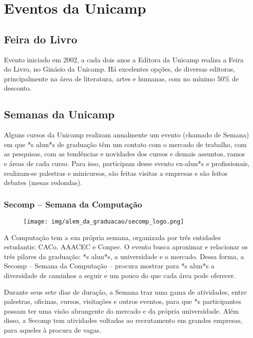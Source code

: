 
\section{Eventos da Unicamp}
\subsection{Feira do Livro}

Evento iniciado em 2002, a cada dois anos a Editora da Unicamp realiza a Feira
do Livro, no Ginásio da Unicamp. Há excelentes opções, de diversas editoras,
principalmente na área de literatura, artes e humanas, com no mínimo 50\% de
desconto.

\subsection{Semanas da Unicamp}

Alguns cursos da Unicamp realizam anualmente um evento (chamado de Semana) em
que *s alun*s de graduação têm um contato com o mercado de trabalho, com as
pesquisas, com as tendências e novidades dos cursos e demais assuntos, ramos e
áreas de cada curso. Para isso, participam desse evento ex-alun*s e
profissionais, realizam-se palestras e minicursos, são feitas visitas a empresas
e são feitos debates (mesas redondas).

\subsubsection{Secomp -- Semana da Computação}

\begin{figure}[H]
    \centering
    \texttt{[image: img/alem\_da\_graduacao/secomp\_logo.png]}
\end{figure}

A Computação tem a sua própria semana, organizada por três entidades estudantis:
CACo, AAACEC e Conpec. O evento busca aproximar e relacionar os três pilares da
graduação: *s alun*s, a universidade e o mercado. Dessa forma, a Secomp --
Semana da Computação -- procura mostrar para *s alun*s a diversidade de caminhos
a seguir e um pouco do que cada área pode oferecer.

Durante seus sete dias de duração, a Semana traz uma gama de atividades, entre
palestras, oficinas, cursos, visitações e outros eventos, para que *s
participantes possam ter uma visão abrangente do mercado e da própria
universidade. Além disso, a Secomp tem atividades voltadas ao recrutamento em
grandes empresas, para aqueles à procura de vagas.

